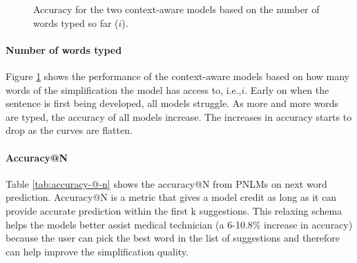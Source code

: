 \documentclass[11pt]{article}
\begin{document}
\begin{figure}[t]
\caption{Accuracy for the two context-aware models based on the number of words typed so far ($i$).}
\label{fig:position_based}
\end{figure}

\paragraph{Number of words typed}
Figure \ref{fig:position_based} shows the performance of the context-aware models based on how many words of the simplification the model has access to, i.e.,$i$. Early on when the sentence is first being developed, all models struggle. As more and more words are typed, the accuracy of all models increase. The increases in accuracy starts to drop as the curves are flatten.

\paragraph{Accuracy@N}

Table \ref{tab:accuracy-@-n} shows the accuracy@N from PNLMs on next word prediction. Accuracy@N is a metric that gives a model credit as long as it can provide accurate prediction within the first k suggestions. This relaxing schema helps the models better assist medical technician (a 6-10.8\% increase in accuracy) because the user can pick the best word in the list of suggestions and therefore can help improve the simplification quality.
\end{document}
